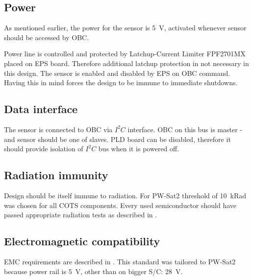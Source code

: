 \subsection{Power}
	As mentioned earlier, the power for the sensor is \SI{+5}{V}, activated whenever sensor should be accessed by OBC. 
	
	Power line is controlled and protected by Latchup-Current Limiter FPF2701MX placed on EPS board. Therefore additional latchup protection in not necessary in this design. The sensor is enabled and disabled by EPS on OBC command. Having this in mind forces the design to be immune to immediate shutdowns. 
	
\subsection{Data interface}
	The sensor is connected to OBC via $I^2C$ interface. OBC on this bus is master - and sensor should be one of slaves. PLD board can be disabled, therefore it should provide isolation of $I^2C$ bus when it is powered off.
	
\subsection{Radiation immunity}
	Design should be itself immune to radiation. For PW-Sat2 threshold of \SI{10}{kRad} was chosen for all COTS components. Every used semiconductor should have passed appropriate radiation tests as described in \cite{ESCIES_TID_test_method}.

\subsection{Electromagnetic compatibility}
	EMC requirements are described in \cite{ECSS_E_ST_20_07C}. This standard was tailored to PW-Sat2 because power rail is \SI{+5}{V}, other than on bigger S/C: \SI{+28}{V}.
	

